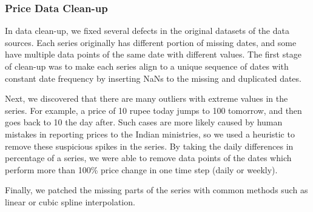 \subsubsection*{Price Data Clean-up}
In data clean-up, we fixed several defects in the original datasets of the data sources. Each series originally has different portion of missing dates, and some have multiple data points of the same date with different values. The first stage of clean-up was to make each series align to a unique sequence of dates with constant date frequency by inserting NaNs to the missing and duplicated dates.

Next, we discovered that there are many outliers with extreme values in the series. For example, a price of 10 rupee today jumps to 100 tomorrow, and then goes back to 10 the day after. Such cases are more likely caused by human mistakes in reporting prices to the Indian ministries, so we used a heuristic to remove these suspicious spikes in the series. By taking the daily differences in percentage of a series, we were able to remove data points of the dates which perform more than 100\% price change in one time step (daily or weekly).

Finally, we patched the missing parts of the series with common methods such as linear or cubic spline interpolation.

